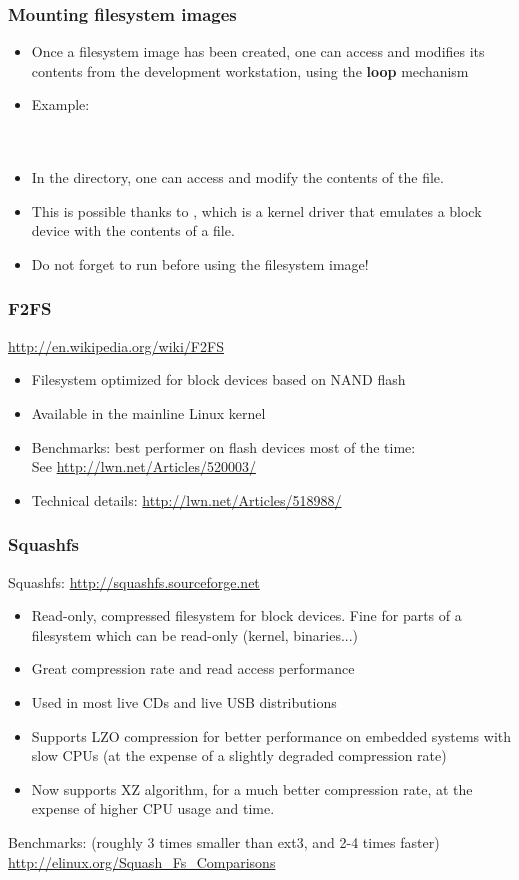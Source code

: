 \begin{frame}
  \frametitle{Mounting filesystem images}
  \begin{itemize}
  \item Once a filesystem image has been created, one can access and
    modifies its contents from the development workstation, using the
    {\bf loop} mechanism
  \item Example:\\
    \\
    \\
  \item In the  directory, one can access and modify
    the contents of the  file.
  \item This is possible thanks to , which is a kernel
    driver that emulates a block device with the contents of a file.
  \item Do not forget to run  before using the filesystem
    image!
  \end{itemize}
\end{frame}

\begin{frame}
  \frametitle{F2FS}
  \url{http://en.wikipedia.org/wiki/F2FS}
  \begin{itemize}
  \item Filesystem optimized for block devices based on NAND flash
  \item Available in the mainline Linux kernel
  \item Benchmarks: best performer on flash devices most of the time: \\
        See \url{http://lwn.net/Articles/520003/}
  \item Technical details: \url{http://lwn.net/Articles/518988/}
  \end{itemize}
\end{frame}

\begin{frame}
  \frametitle{Squashfs}
  Squashfs: \url{http://squashfs.sourceforge.net}
  \begin{itemize}
  \item Read-only, compressed filesystem for block devices. Fine for
    parts of a filesystem which can be read-only (kernel, binaries...)
  \item Great compression rate and read access performance
  \item Used in most live CDs and live USB distributions
  \item Supports LZO compression for better performance on embedded
    systems with slow CPUs (at the expense of a slightly degraded
    compression rate)
  \item Now supports XZ algorithm, for a much better compression rate,
        at the expense of higher CPU usage and time.
  \end{itemize}
  Benchmarks: (roughly 3 times smaller than ext3, and 2-4 times faster)\\
  \url{http://elinux.org/Squash_Fs_Comparisons}
\end{frame}

